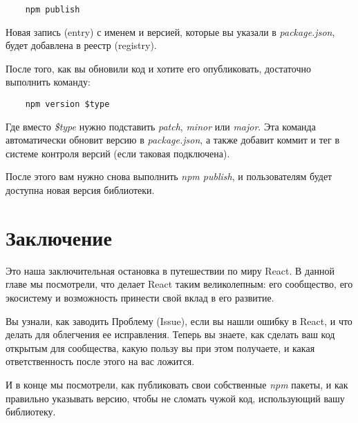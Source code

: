 \begin{lstlisting}
	npm publish
\end{lstlisting}

Новая запись (entry) с именем и версией, которые вы указали в \textit{package.json}, будет добавлена в реестр (registry). 

После того, как вы обновили код и хотите его опубликовать, достаточно выполнить команду:

\begin{lstlisting}
	npm version $type
\end{lstlisting}

Где вместо \textit{\$type} нужно подставить \textit{patch}, \textit{minor} или \textit{major}. Эта команда автоматически обновит версию в \textit{package.json}, а также добавит коммит и тег в системе контроля версий (если таковая подключена).

После этого вам нужно снова выполнить \textit{npm publish}, и пользователям будет доступна новая версия библиотеки.

\section{Заключение}

Это наша заключительная остановка в путешествии по миру React. В данной главе мы посмотрели, что делает React таким великолепным: его сообщество, его экосистему и возможность принести свой вклад в его развитие.

Вы узнали, как заводить Проблему (Issue), если вы нашли ошибку в React, и что делать для облегчения ее исправления. Теперь вы знаете, как сделать ваш код открытым для сообщества, какую пользу вы при этом получаете, и какая ответственность после этого на вас ложится.

И в конце мы посмотрели, как публиковать свои собственные \textit{npm} пакеты, и как правильно указывать версию, чтобы не сломать чужой код, использующий вашу библиотеку.










